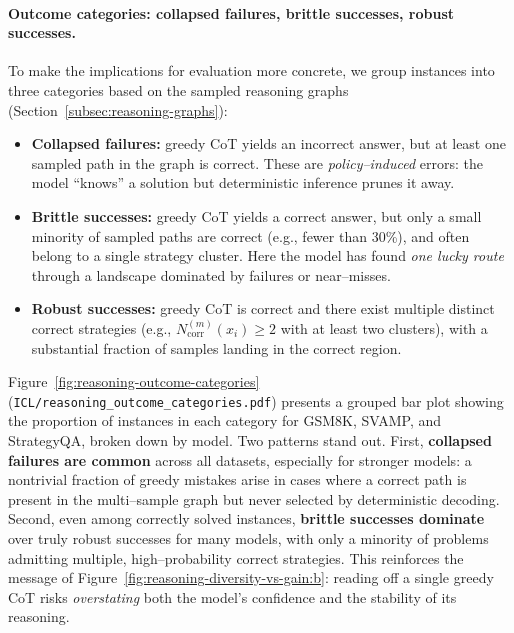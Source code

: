 \paragraph{Outcome categories: collapsed failures, brittle successes, robust successes.}
To make the implications for evaluation more concrete, we group
instances into three categories based on the sampled reasoning graphs
(Section~\ref{subsec:reasoning-graphs}):

\begin{itemize}[leftmargin=1.5em]
  \item \textbf{Collapsed failures:}
  greedy CoT yields an incorrect answer, but at least one sampled path
  in the graph is correct.
  These are \emph{policy--induced} errors: the model ``knows'' a
  solution but deterministic inference prunes it away.

  \item \textbf{Brittle successes:}
  greedy CoT yields a correct answer, but only a small minority of
  sampled paths are correct (e.g., fewer than 30\%), and often
  belong to a single strategy cluster.
  Here the model has found \emph{one lucky route} through a landscape
  dominated by failures or near--misses.

  \item \textbf{Robust successes:}
  greedy CoT is correct and there exist multiple distinct correct
  strategies (e.g., $N_{\text{corr}}^{(m)}(x_i) \ge 2$ with at least
  two clusters), with a substantial fraction of samples landing in the
  correct region.
\end{itemize}

Figure~\ref{fig:reasoning-outcome-categories}
(\texttt{ICL/reasoning\_outcome\_categories.pdf}) presents a grouped bar
plot showing the proportion of instances in each category for GSM8K,
SVAMP, and StrategyQA, broken down by model.
Two patterns stand out.
First, \textbf{collapsed failures are common} across all datasets,
especially for stronger models: a nontrivial fraction of greedy
mistakes arise in cases where a correct path is present in the
multi--sample graph but never selected by deterministic decoding.
Second, even among correctly solved instances, \textbf{brittle
successes dominate} over truly robust successes for many models, with
only a minority of problems admitting multiple, high--probability
correct strategies.
This reinforces the message of
Figure~\ref{fig:reasoning-diversity-vs-gain:b}: reading off a single
greedy CoT risks \emph{overstating} both the model’s confidence and the
stability of its reasoning.

